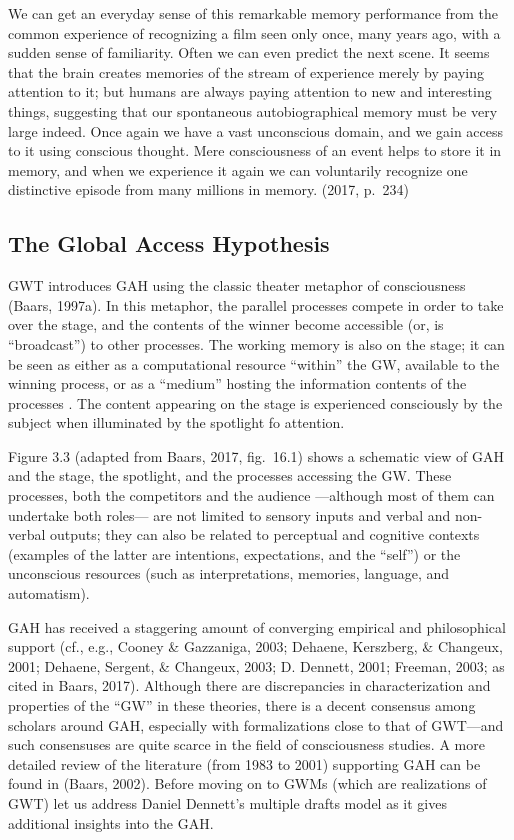 \documentclass[12pt,twoside]{reedthesis}
\begin{document}
We can get an everyday sense of this remarkable memory performance from the common experience of recognizing a film seen only once, many years ago, with a sudden sense of familiarity. Often we can even predict the next scene. It seems that the brain creates memories of the stream of experience merely by paying attention to it; but humans are always paying attention to new and interesting things, suggesting that our spontaneous autobiographical memory must be very large indeed. Once again we have a vast unconscious domain, and we gain access to it using conscious thought. Mere consciousness of an event helps to store it in memory, and when we experience it again we can voluntarily recognize one distinctive episode from many millions in memory. (2017, p.~234)

\hypertarget{the-global-access-hypothesis}{%
\subsection{The Global Access Hypothesis}\label{the-global-access-hypothesis}}

GWT introduces GAH using the classic theater metaphor of consciousness (Baars, 1997a). In this metaphor, the parallel processes compete in order to take over the stage, and the contents of the winner become accessible (or, is ``broadcast'') to other processes. The working memory is also on the stage; it can be seen as either as a computational resource ``within'' the GW, available to the winning process, or as a ``medium'' hosting the information contents of the processes . The content appearing on the stage is experienced consciously by the subject when illuminated by the spotlight fo attention.

Figure 3.3 (adapted from Baars, 2017, fig.~16.1) shows a schematic view of GAH and the stage, the spotlight, and the processes accessing the GW. These processes, both the competitors and the audience ---although most of them can undertake both roles--- are not limited to sensory inputs and verbal and non-verbal outputs; they can also be related to perceptual and cognitive contexts (examples of the latter are intentions, expectations, and the ``self'') or the unconscious resources (such as interpretations, memories, language, and automatism).

GAH has received a staggering amount of converging empirical and philosophical support (cf., e.g., Cooney \& Gazzaniga, 2003; Dehaene, Kerszberg, \& Changeux, 2001; Dehaene, Sergent, \& Changeux, 2003; D. Dennett, 2001; Freeman, 2003; as cited in Baars, 2017). Although there are discrepancies in characterization and properties of the ``GW'' in these theories, there is a decent consensus among scholars around GAH, especially with formalizations close to that of GWT---and such consensuses are quite scarce in the field of consciousness studies. A more detailed review of the literature (from 1983 to 2001) supporting GAH can be found in (Baars, 2002). Before moving on to GWMs (which are realizations of GWT) let us address Daniel Dennett's multiple drafts model as it gives additional insights into the GAH.
\end{document}
